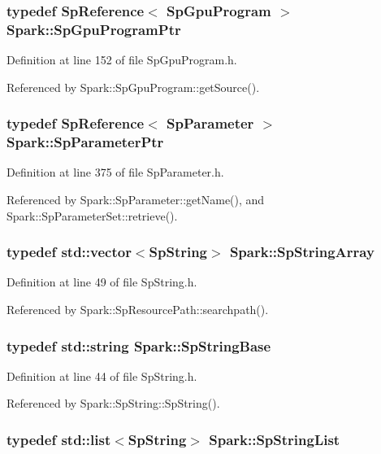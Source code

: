 \subsubsection{\setlength{\rightskip}{0pt plus 5cm}typedef {\bf Sp\-Reference}$<$ {\bf Sp\-Gpu\-Program} $>$ {\bf Spark::Sp\-Gpu\-Program\-Ptr}}\label{namespaceSpark_a0}


Definition at line 152 of file Sp\-Gpu\-Program.h.

Referenced by Spark::Sp\-Gpu\-Program::get\-Source().
\subsubsection{\setlength{\rightskip}{0pt plus 5cm}typedef {\bf Sp\-Reference}$<$ {\bf Sp\-Parameter} $>$ {\bf Spark::Sp\-Parameter\-Ptr}}\label{namespaceSpark_a1}


Definition at line 375 of file Sp\-Parameter.h.

Referenced by Spark::Sp\-Parameter::get\-Name(), and Spark::Sp\-Parameter\-Set::retrieve().
\subsubsection{\setlength{\rightskip}{0pt plus 5cm}typedef std::vector$<${\bf Sp\-String}$>$ {\bf Spark::Sp\-String\-Array}}\label{namespaceSpark_a4}


Definition at line 49 of file Sp\-String.h.

Referenced by Spark::Sp\-Resource\-Path::searchpath().
\subsubsection{\setlength{\rightskip}{0pt plus 5cm}typedef std::string {\bf Spark::Sp\-String\-Base}}\label{namespaceSpark_a2}


Definition at line 44 of file Sp\-String.h.

Referenced by Spark::Sp\-String::Sp\-String().
\subsubsection{\setlength{\rightskip}{0pt plus 5cm}typedef std::list$<${\bf Sp\-String}$>$ {\bf Spark::Sp\-String\-List}}\label{namespaceSpark_a5}


